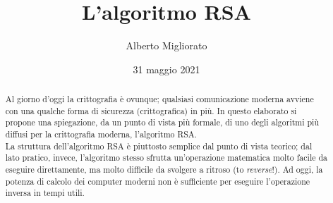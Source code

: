 \documentclass[a4paper,12pt]{article}
\begin{document}
\title{L'algoritmo RSA}
\author{Alberto Migliorato}
\date{31 maggio 2021}
\maketitle
\thispagestyle{empty}
\begin{abstract}
Al giorno d'oggi la crittografia è ovunque; qualsiasi comunicazione moderna avviene con una qualche forma di sicurezza (crittografica) in più. In questo elaborato si propone una spiegazione, da un punto di vista più formale, di uno degli algoritmi più diffusi per la crittografia moderna, l'algoritmo RSA.\\
La struttura dell'algoritmo RSA è piuttosto semplice dal punto di vista teorico; dal lato pratico, invece, l'algoritmo stesso sfrutta un'operazione matematica molto facile da eseguire direttamente, ma molto difficile da svolgere a ritroso (to \emph{reverse}!). Ad oggi, la potenza di calcolo dei computer moderni non è sufficiente per eseguire l'operazione inversa in tempi utili.
\end{abstract}
\newpage
\tableofcontents
\newpage
\end{document}
